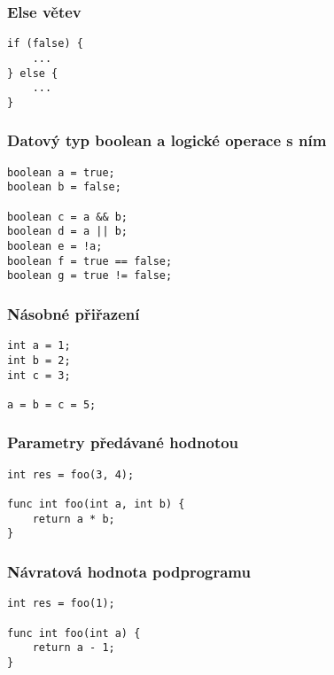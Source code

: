 \documentclass[czech, oth, kiv, he, iso690numb, viewonly]{fasthesis}
\begin{document}
    \subsubsection*{Else větev}
    \begin{verbatim}
if (false) {
    ...
} else {
    ...
}
    \end{verbatim}

    \subsubsection*{Datový typ boolean a logické operace s ním}
    \begin{verbatim}
boolean a = true;
boolean b = false;

boolean c = a && b;
boolean d = a || b;
boolean e = !a;
boolean f = true == false;
boolean g = true != false;
    \end{verbatim}

    \subsubsection*{Násobné přiřazení}
    \begin{verbatim}
int a = 1;
int b = 2;
int c = 3;

a = b = c = 5;
    \end{verbatim}

    \subsubsection*{Parametry předávané hodnotou}
    \begin{verbatim}
int res = foo(3, 4);
    
func int foo(int a, int b) {
    return a * b;
}
    \end{verbatim}

    \subsubsection*{Návratová hodnota podprogramu}
    \begin{verbatim} 
int res = foo(1);

func int foo(int a) {
    return a - 1;
}
    \end{verbatim}
\end{document}
